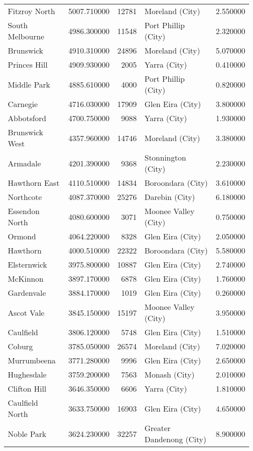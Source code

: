 \begin{table}
\begin{tabular}{lrrlr}
Fitzroy North & 5007.710000 & 12781 & Moreland (City) & 2.550000 \\
South Melbourne & 4986.300000 & 11548 & Port Phillip (City) & 2.320000 \\
Brunswick & 4910.310000 & 24896 & Moreland (City) & 5.070000 \\
Princes Hill & 4909.930000 & 2005 & Yarra (City) & 0.410000 \\
Middle Park & 4885.610000 & 4000 & Port Phillip (City) & 0.820000 \\
Carnegie & 4716.030000 & 17909 & Glen Eira (City) & 3.800000 \\
Abbotsford & 4700.750000 & 9088 & Yarra (City) & 1.930000 \\
Brunswick West & 4357.960000 & 14746 & Moreland (City) & 3.380000 \\
Armadale & 4201.390000 & 9368 & Stonnington (City) & 2.230000 \\
Hawthorn East & 4110.510000 & 14834 & Boroondara (City) & 3.610000 \\
Northcote & 4087.370000 & 25276 & Darebin (City) & 6.180000 \\
Essendon North & 4080.600000 & 3071 & Moonee Valley (City) & 0.750000 \\
Ormond & 4064.220000 & 8328 & Glen Eira (City) & 2.050000 \\
Hawthorn & 4000.510000 & 22322 & Boroondara (City) & 5.580000 \\
Elsternwick & 3975.800000 & 10887 & Glen Eira (City) & 2.740000 \\
McKinnon & 3897.170000 & 6878 & Glen Eira (City) & 1.760000 \\
Gardenvale & 3884.170000 & 1019 & Glen Eira (City) & 0.260000 \\
Ascot Vale & 3845.150000 & 15197 & Moonee Valley (City) & 3.950000 \\
Caulfield & 3806.120000 & 5748 & Glen Eira (City) & 1.510000 \\
Coburg & 3785.050000 & 26574 & Moreland (City) & 7.020000 \\
Murrumbeena & 3771.280000 & 9996 & Glen Eira (City) & 2.650000 \\
Hughesdale & 3759.200000 & 7563 & Monash (City) & 2.010000 \\
Clifton Hill & 3646.350000 & 6606 & Yarra (City) & 1.810000 \\
Caulfield North & 3633.750000 & 16903 & Glen Eira (City) & 4.650000 \\
Noble Park & 3624.230000 & 32257 & Greater Dandenong (City) & 8.900000 \\

\end{tabular}
\end{table}

